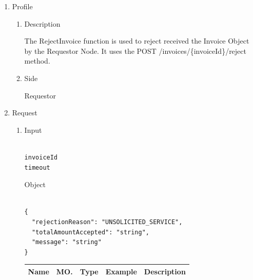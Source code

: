 \newpage



\begin{enumerate}

\item Profile

\begin{enumerate}

\item Description

The RejectInvoice function is used to reject received the Invoice Object by the Requestor Node. 
It uses the POST /invoices/\{invoiceId\}/reject method.

\item Side

Requestor

\end{enumerate}

\item Request

\begin{enumerate}

\item Input

\begin{tcolorbox}[boxrule=0pt, frame empty]
\begin{verbatim}

invoiceId
timeout

\end{verbatim}
\end{tcolorbox}

Object

\begin{tcolorbox}[boxrule=0pt, frame empty]
\begin{verbatim}

{
  "rejectionReason": "UNSOLICITED_SERVICE",
  "totalAmountAccepted": "string",
  "message": "string"
}

\end{verbatim}
\end{tcolorbox}

\begin{table}[H]
\footnotesize

\begin{center}
\begin{tabular}{|p{3cm}|l|p{3cm}|p{3cm}|p{4cm}|} 
\hline
\rowcolor{lightgray}	Name	& MO.	& Type	& Example & 	Description \\
\hline


\end{tabular}
\end{center}
\end{table}
\end{enumerate}
\end{enumerate}
